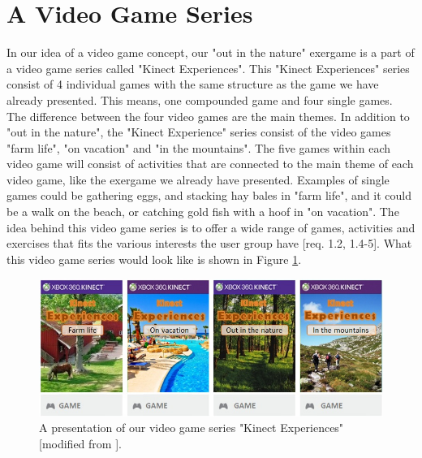 \section{A Video Game Series}
In our idea of a video game concept, our "out in the nature" exergame is a part of a video game series called "Kinect Experiences". This "Kinect Experiences" series consist of 4 individual games with the same structure as the game we have already presented. This means, one compounded game and four single games. The difference between the four video games are the main themes. In addition to "out in the nature", the "Kinect Experience" series consist of the video games "farm life", "on vacation" and "in the mountains". The five games within each video game will consist of activities that are connected to the main theme of each video game, like the exergame we already have presented. Examples of single games could be gathering eggs, and stacking hay bales in "farm life", and it could be a walk on the beach, or catching gold fish with a hoof in "on vacation". The idea behind this video game series is to offer a wide range of games, activities and exercises that fits the various interests the user group have [req. 1.2, 1.4-5]. What this video game series would look like is shown in Figure \ref{fig:videogameseriesAlone}. 

\begin{figure} [H]
\centering
\includegraphics[scale=0.65]{videoGameSeriesAlone.jpg}
\caption[Presentation of our video game series]{A presentation of our video game series "Kinect Experiences" [modified from \cite{XboxNettside}].}
\label{fig:videogameseriesAlone}
\end{figure}

